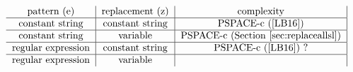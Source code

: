 \[
\begin{tabular}{c|c|c|c}
pattern (e)  &   replacement (z)        & complexity \\
\hline
constant string  &   constant   string                    & PSPACE-c (\cite{LB16})     \\
\hline
constant string  &   variable                       & PSPACE-c (Section \ref{sec:replaceallsl})       \\
\hline
regular expression  &   constant string                      &    PSPACE-c (\cite{LB16}) ?     \\
\hline
regular expression  &   variable                       &           \\
\end{tabular}
\]